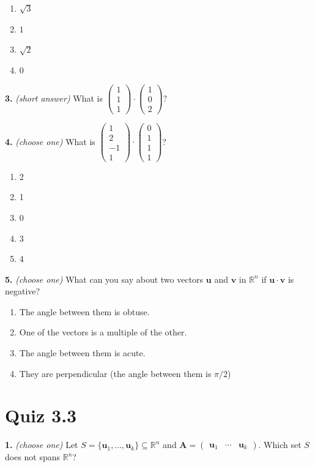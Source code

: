 \documentclass[10pt,a4paper]{article}
\begin{document}
\begin{enumerate}[label=(\Alph*)]
\item \(\sqrt{3}\)
\item \(1\)
\item \(\sqrt{2}\)
\item \(0\)
\end{enumerate}
\smallskip
\textbf{3.} \textit{(short answer)} What is \(\begin{pmatrix}1\\1\\1\end{pmatrix}\cdot\begin{pmatrix}1\\0\\2\end{pmatrix}\)?

\smallskip
\textbf{4.} \textit{(choose one)} What is \(\begin{pmatrix}1\\2\\-1\\1\end{pmatrix}\cdot\begin{pmatrix}0\\1\\1\\1\end{pmatrix}\)?

\begin{enumerate}[label=(\Alph*)]
\item 2
\item 1
\item 0
\item 3
\item 4
\end{enumerate}
\smallskip
\textbf{5.} \textit{(choose one)} What can you say about two vectors \(\mathbf{u}\) and \(\mathbf{v}\) in \(\mathbb{R}^n\) if \(\mathbf{u\cdot v}\) is negative?

\begin{enumerate}[label=(\Alph*)]
\item The angle between them is obtuse.
\item One of the vectors is a multiple of the other.
\item The angle between them is acute.
\item They are perpendicular (the angle between them is \(\pi/2\))
\end{enumerate}
\smallskip
\section{Quiz 3.3}
\textbf{1.} \textit{(choose one)} Let \(S=\{\mathbf{u}_1,...,\mathbf{u}_k\}\subseteq\mathbb{R}^n\) and \(\mathbf{A}=\begin{pmatrix}\mathbf{u}_1&\cdots&\mathbf{u}_k\end{pmatrix}\). Which set \(S\) does not spans \(\mathbb{R}^n\)?
\end{document}
